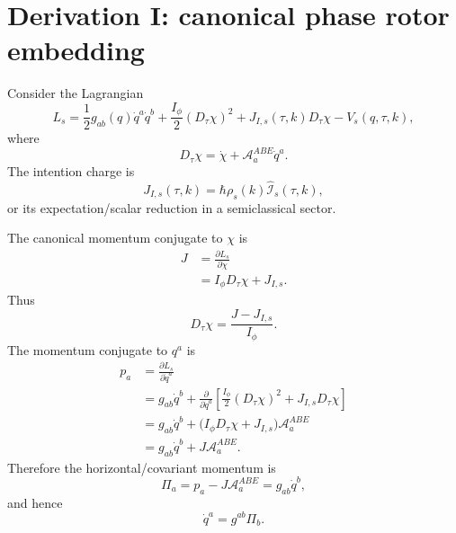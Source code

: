 \documentclass[11pt,a4paper]{article}
\newcommand{\Abe}{\mathcal A^{ABE}}
\newcommand{\Iop}{\hat{\mathcal I}}
\begin{document}
\section{Derivation I: canonical phase rotor embedding}

Consider the Lagrangian
\begin{equation}
\boxed{
  L_s
  =\frac12 g_{ab}(q)\dot q^a\dot q^b
  +\frac{I_\phi}{2}\left(D_\tau\chi\right)^2
  +J_{I,s}(\tau,k)D_\tau\chi
  -V_s(q,\tau,k),}
  \label{eq:lagrangian}
\end{equation}
where
\begin{equation}
  D_\tau\chi=\dot\chi+\Abe_a\dot q^a.
\end{equation}
The intention charge is
\begin{equation}
  J_{I,s}(\tau,k)=\hbar\rho_s(k)\Iop_s(\tau,k),
\end{equation}
or its expectation/scalar reduction in a semiclassical sector.

The canonical momentum conjugate to $\chi$ is
\begin{align}
  J
  &=\frac{\partial L_s}{\partial\dot\chi}\\
  &=I_\phi D_\tau\chi+J_{I,s}.
  \label{eq:J_momentum}
\end{align}
Thus
\begin{equation}
  D_\tau\chi=\frac{J-J_{I,s}}{I_\phi}.
  \label{eq:Dchi_solved}
\end{equation}
The momentum conjugate to $q^a$ is
\begin{align}
  p_a
  &=\frac{\partial L_s}{\partial\dot q^a}\\
  &=g_{ab}\dot q^b+\frac{\partial}{\partial\dot q^a}\left[\frac{I_\phi}{2}(D_\tau\chi)^2+J_{I,s}D_\tau\chi\right]\\
  &=g_{ab}\dot q^b+\bigl(I_\phi D_\tau\chi+J_{I,s}\bigr)\Abe_a\\
  &=g_{ab}\dot q^b+J\Abe_a.
  \label{eq:p_momentum}
\end{align}
Therefore the horizontal/covariant momentum is
\begin{equation}
  \Pi_a=p_a-J\Abe_a=g_{ab}\dot q^b,
  \label{eq:cov_momentum}
\end{equation}
and hence
\begin{equation}
  \dot q^a=g^{ab}\Pi_b.
\end{equation}
\end{document}
